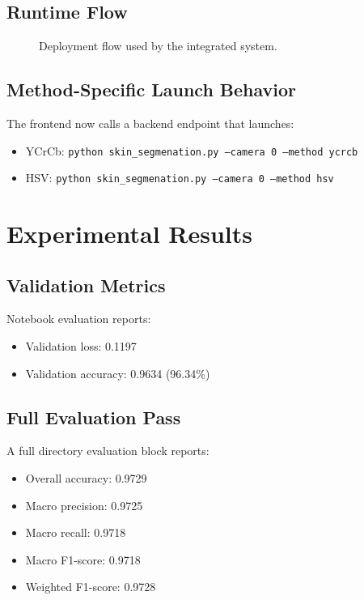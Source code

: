 \documentclass[conference]{IEEEtran}
\begin{document}
\subsection{Runtime Flow}
\begin{figure}[t]
\centering
{}
\caption{Deployment flow used by the integrated system.}
\label{fig:runtime}
\end{figure}

\subsection{Method-Specific Launch Behavior}
The frontend now calls a backend endpoint that launches:
\begin{itemize}
\item YCrCb: \texttt{python skin\_segmenation.py --camera 0 --method ycrcb}
\item HSV: \texttt{python skin\_segmenation.py --camera 0 --method hsv}
\end{itemize}

\section{Experimental Results}
\subsection{Validation Metrics}
Notebook evaluation reports:
\begin{itemize}
\item Validation loss: 0.1197
\item Validation accuracy: 0.9634 (96.34\%)
\end{itemize}

\subsection{Full Evaluation Pass}
A full directory evaluation block reports:
\begin{itemize}
\item Overall accuracy: 0.9729
\item Macro precision: 0.9725
\item Macro recall: 0.9718
\item Macro F1-score: 0.9718
\item Weighted F1-score: 0.9728
\end{itemize}
\end{document}
